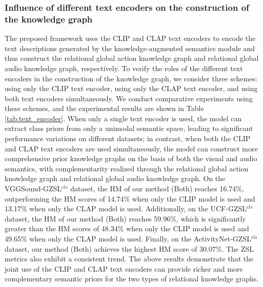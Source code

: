 \documentclass[lettersize,journal]{IEEEtran}
\begin{document}
\subsubsection{Influence of different text encoders on the construction of the knowledge graph}
The proposed framework uses the CLIP and CLAP text encoders to encode the text descriptions generated by the knowledge-augmented semantics module and thus construct the relational global action knowledge graph and relational global audio knowledge graph, respectively. To verify the roles of the different text encoders in the construction of the knowledge graph, we consider three schemes: using only the CLIP text encoder, using only the CLAP text encoder, and using both text encoders simultaneously. We conduct comparative experiments using these schemes, and the experimental results are shown in Table \ref{tab:text_encoder}. When only a single text encoder is used, the model can extract class priors from only a unimodal semantic space, leading to significant performance variations on different datasets; in contrast, when both the CLIP and CLAP text encoders are used simultaneously, the model can construct more comprehensive prior knowledge graphs on the basis of both the visual and audio semantics, with complementarity realized through the relational global action knowledge graph and relational global audio knowledge graph. On the VGGSound-GZSL$^{\textit{cls}}$ dataset, the HM of our method (Both) reaches 16.74\%, outperforming the HM scores of 14.74\% when only the CLIP model is used and 13.17\% when only the CLAP model is used. Additionally, on the UCF-GZSL$^{\textit{cls}}$ dataset, the HM of our method (Both) reaches 59.96\%, which is significantly greater than the HM scores of 48.34\% when only the CLIP model is used and 49.65\% when only the CLAP model is used. Finally, on the ActivityNet-GZSL$^{\textit{cls}}$ dataset, our method (Both) achieves the highest HM score of 30.07\%. The ZSL metrics also exhibit a consistent trend. The above results demonstrate that the joint use of the CLIP and CLAP text encoders can provide richer and more complementary semantic priors for the two types of relational knowledge graphs.
\end{document}
